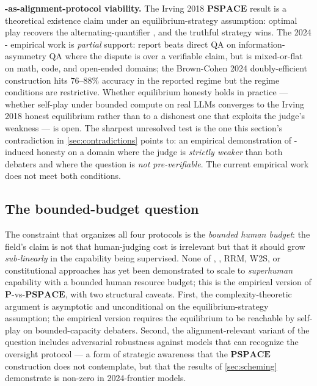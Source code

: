 \begin{contradiction}
\textbf{-as-alignment-protocol viability.} The Irving 2018
$\mathbf{PSPACE}$ result \citep[Theorem 1]{irving2018-debate} is a
theoretical existence claim under an equilibrium-strategy assumption:
optimal play recovers the alternating-quantifier , and the
truthful strategy wins. The 2024 - empirical work is
\emph{partial} support: \citet{kenton2024-debate-llm-judges} report
 beats direct QA on information-asymmetry QA where the dispute
is over a verifiable claim, but is mixed-or-flat on math, code, and
open-ended domains; the Brown-Cohen 2024 doubly-efficient construction
 hits $76$--$88\%$ accuracy in the reported regime
but the regime conditions are restrictive. Whether equilibrium
honesty holds in practice --- whether self-play under bounded compute
on real LLMs converges to the Irving 2018 honest equilibrium rather
than to a dishonest one that exploits the judge's weakness --- is
open. The sharpest unresolved test is the one this section's
contradiction in \cref{sec:contradictions} points to: an empirical
demonstration of -induced honesty on a domain where the judge
is \emph{strictly weaker} than both debaters and where the question
is \emph{not pre-verifiable}. The current empirical work does not
meet both conditions.
\end{contradiction}

\subsection{The bounded-budget question}
\label{sec:oversight-bounded-budget}

The constraint that organizes all four protocols is the
\emph{bounded human budget}: the field's claim is not that
human-judging cost is irrelevant but that it should grow
\emph{sub-linearly} in the capability being supervised. None of ,
, RRM, W2S, or constitutional approaches has yet been demonstrated
to scale to \emph{superhuman} capability with a bounded human resource
budget; this is the empirical version of
$\mathbf{P}$-vs-$\mathbf{PSPACE}$, with two structural caveats. First,
the complexity-theoretic argument is asymptotic and unconditional on
the equilibrium-strategy assumption; the empirical version requires
the equilibrium to be reachable by self-play on bounded-capacity
debaters. Second, the alignment-relevant variant of the question
includes adversarial robustness against models that can recognize the
oversight protocol --- a form of strategic awareness that the
$\mathbf{PSPACE}$ construction does not contemplate, but that the
 results of \cref{sec:scheming} demonstrate is non-zero in
2024-frontier models.

